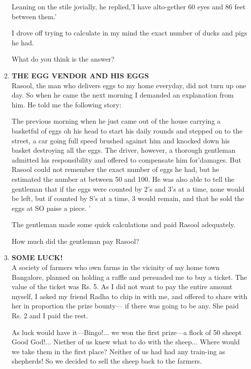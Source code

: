 \documentclass[12pt]{article}
\begin{document}
\begin{enumerate}
Leaning  on the  stile  jovially,  he replied,'I  have  alto-gether  60 eyes  and 86 feet between  them.'

I drove  off trying  to calculate  in my mind  the  exact number  of ducks  and pigs  he had. 

What  do you think  is the answer? 
%
\item \textbf{THE  EGG  VENDOR  AND  HIS  EGGS} \\
Rasool,  the man  who  delivers  eggs  to my home  everyday, did not  turn  up one  day.  So  when  he came  the next morning  I demanded  an explanation  from  him.  He  told me the following  story: 

The previous  morning  when  he just  came  out  of the house  carrying  a basketful  of eggs  oh his head  to start  his daily  rounds  and  stepped  on to the  street,  a car going full speed  brushed  against  him  and  knocked  down  his basket  destroying  all the  eggs.  The  driver,  however,  a thorough  gentleman  admitted  his responsibility  and offered to compensate  him  for'damages.  But  Rasool  could not remember  the exact  number  of eggs  he had,  but  he estimated  the  number  at between  50 and 100.  He  was also able  to tell the gentleman  that  if the eggs  were  counted by 2's and 3's at a time,  none  would  be left,  but if counted by S's at a time,  3 would  remain,  and that  he sold  the eggs at SO paise  a piece.  ' 

The gentleman  made  some  quick  calculations  and paid Rasool  adequately. 

How  much  did the gentleman  pay Rasool? 
%
\item \textbf{SOME  LUCK!} \\
A society  of farmers  who  own  farms  in the vicinity  of my home  town  Bangalore,  planned  on holding  a raffle and persuaded  me to buy a ticket.  The  value  of the ticket was Rs. 5. As  I did not want  to pay  the entire  amount myself,  I asked  my friend  Radha  to chip  in with  me,  and offered  to share  with  her in proportion  the prize  bounty— if there  was  going  to be any.  She  paid  Rs. 2 and  I paid the rest. 

As luck  would  have  it—Bingo!...  we won  the first prize—a  flock  of 50 sheept  Good  God!...  Niether  of us knew  what  to do with  the sheep...  Where  would  we take them  in the first  place?  Neither  of us had had any  train-ing as shepherds!  So  we decided  to sell the sheep  back to the farmers. 


\end{enumerate}
\end{document}
